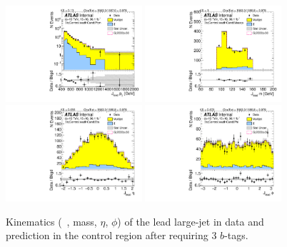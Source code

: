 \clearpage

\begin{figure}[htbp!]
\begin{center}
\includegraphics[width=0.45\textwidth,angle=-90]{figures/boosted/Control/b77_ThreeTag_Control_leadHCand_Pt_m_1.pdf}
\includegraphics[width=0.45\textwidth,angle=-90]{figures/boosted/Control/b77_ThreeTag_Control_leadHCand_Mass_s.pdf}\\
\includegraphics[width=0.45\textwidth,angle=-90]{figures/boosted/Control/b77_ThreeTag_Control_leadHCand_Eta.pdf}
\includegraphics[width=0.45\textwidth,angle=-90]{figures/boosted/Control/b77_ThreeTag_Control_leadHCand_Phi.pdf}
  \caption{Kinematics (\pt~, mass, $\eta$, $\phi$) of the lead large-\R jet in data and prediction in the control region after requiring 3 $b$-tags. }
  \label{fig:boosted-3b-control-ak10-lead}
\end{center}
\end{figure}

